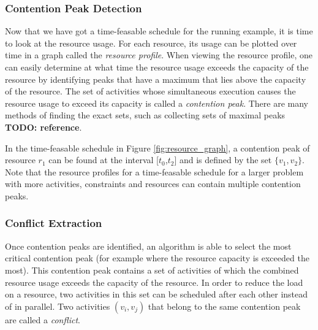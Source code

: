 \documentclass{article}
\theoremstyle{definition}
\newcommand{\inputtikz}[1]{}
\newcommand{\TODO}[1]{{\color{red}\textbf{TODO: #1}}}
\begin{document}
\begin{comment}
\TODO{wat is handiger voor het uitleggen, infeasible profile alleen of de vergelijking van de schedules?}
\begin{figure}[h]
	\centering
	\inputtikz{schedule_comparison}
	\caption{Two different schedules for the running example and their resource profiles. }
	\label{fig:resource_graph}
\end{figure}
\end{comment}

\subsubsection{Contention Peak Detection}
Now that we have got a time-feasable schedule for the running example, it is time to look at the resource usage. For each resource, its usage can be plotted over time in a graph called the \emph{resource profile}. When viewing the resource profile, one can easily determine at what time the resource usage exceeds the capacity of the resource by identifying peaks that have a maximum that lies above the capacity of the resource. The set of activities whose simultaneous execution causes the resource usage to exceed its capacity is called a \emph{contention peak}. There are many methods of finding the exact sets, such as collecting sets of maximal peaks \TODO{reference}.

In the time-feasable schedule in Figure \ref{fig:resource_graph}, a contention peak of resource $r_1$ can be found at the interval [$t_0$,$t_2$] and is defined by the set $\{v_1,v_2\}$. Note that the resource profiles for a time-feasable schedule for a larger problem with more activities, constraints and resources can contain multiple contention peaks.

\subsubsection{Conflict Extraction}
\label{text:conflict}
Once contention peaks are identified, an algorithm is able to select the most critical contention peak (for example where the resource capacity is exceeded the most). This contention peak contains a set of activities of which the combined resource usage exceeds the capacity of the resource. In order to reduce the load on a resource, two activities in this set can be scheduled after each other instead of in parallel. Two activities $(v_i,v_j)$ that belong to the same contention peak are called a \emph{conflict}.
\end{document}
